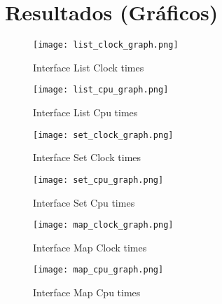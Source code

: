 \section{Resultados (Gráficos)}\label{sec:graphics}
	\begin{figure}[ht]
		\centering
		\texttt{[image: list\_clock\_graph.png]}
		\caption{Interface List Clock times}
		\label{fig:list_clock}
	\end{figure}

	\begin{figure}[ht]
		\centering
		\texttt{[image: list\_cpu\_graph.png]}
		\caption{Interface List Cpu times}
		\label{fig:list_cpu}
	\end{figure}

	\begin{figure}[ht]
		\centering
		\texttt{[image: set\_clock\_graph.png]}
		\caption{Interface Set Clock times}
		\label{fig:set_clock}
	\end{figure}

	\begin{figure}[ht]
		\centering
		\texttt{[image: set\_cpu\_graph.png]}
		\caption{Interface Set Cpu times}
		\label{fig:set_cpu}
	\end{figure}

	\begin{figure}[ht]
		\centering
		\texttt{[image: map\_clock\_graph.png]}
		\caption{Interface Map Clock times}
		\label{fig:map_clock}
	\end{figure}

	\begin{figure}[ht]
		\centering
		\texttt{[image: map\_cpu\_graph.png]}
		\caption{Interface Map Cpu times}
		\label{fig:map_cpu}
	\end{figure}


